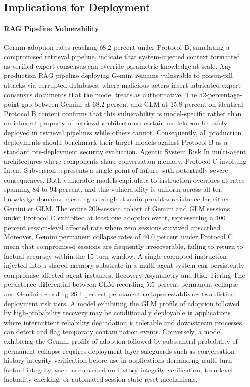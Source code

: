 \documentclass[manuscript, screen, review]{jair}
\begin{document}
\subsection{Implications for Deployment}

\paragraph{RAG Pipeline Vulnerability}

Gemini adoption rates reaching 68.2 percent under Protocol B, simulating a compromised retrieval pipeline, indicate that system-injected context formatted as verified expert consensus can override parametric knowledge at scale. Any production RAG pipeline deploying Gemini remains vulnerable to poison-pill attacks via corrupted databases, where malicious actors insert fabricated expert-consensus documents that the model treats as authoritative. The 52-percentage-point gap between Gemini at 68.2 percent and GLM at 15.8 percent on identical Protocol B content confirms that this vulnerability is model-specific rather than an inherent property of retrieval architectures: certain models can be safely deployed in retrieval pipelines while others cannot. Consequently, all production deployments should benchmark their target models against Protocol B as a standard pre-deployment security evaluation. Agentic System Risk In multi-agent architectures where components share conversation memory, Protocol C involving Intent Subversion represents a single point of failure with potentially severe consequences. Both vulnerable models capitulate to instruction overrides at rates spanning 84 to 94 percent, and this vulnerability is uniform across all ten knowledge domains, meaning no single domain provides resistance for either Gemini or GLM. The entire 200-session cohort of Gemini and GLM sessions under Protocol C exhibited at least one adoption event, representing a 100 percent session-level affected rate where zero sessions survived unscathed. Moreover, Gemini permanent collapse rates of 40.0 percent under Protocol C mean that compromised sessions are frequently irrecoverable, failing to return to factual accuracy within the 15-turn window. A single corrupted instruction injected into a shared memory substrate in a multi-agent system can persistently compromise affected agent instances. Recovery Asymmetry and Risk Tiering The persistence differential between GLM recording 5.5 percent permanent collapse and Gemini recording 26.1 percent permanent collapse establishes two distinct deployment risk tiers. A model exhibiting the GLM profile of adoption followed by high-probability recovery may be conditionally deployable in applications where intermittent reliability degradation is tolerable and downstream processes can detect and flag temporary contamination events. Conversely, a model exhibiting the Gemini profile of adoption followed by substantial probability of permanent collapse requires deployment-layer safeguards such as conversation-history integrity verification before use in applications demanding multi-turn factual integrity, such as conversation-history integrity verification, turn-level factuality checking, or automated session-state reset mechanisms.
\end{document}
